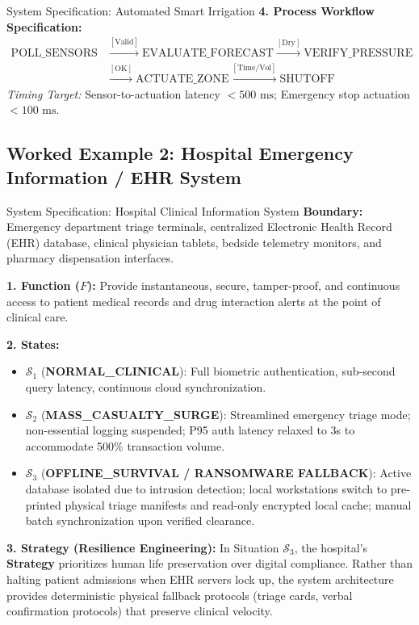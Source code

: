 \begin{examplebox}{System Specification: Automated Smart Irrigation}
\textbf{4. Process Workflow Specification:}
\begin{equation}
\begin{aligned}
    \text{POLL\_SENSORS} &\xrightarrow{[\text{Valid}]} \text{EVALUATE\_FORECAST} \xrightarrow{[\text{Dry}]} \text{VERIFY\_PRESSURE} \\
    &\xrightarrow{[\text{OK}]} \text{ACTUATE\_ZONE} \xrightarrow{[\text{Time/Vol}]} \text{SHUTOFF}
\end{aligned}
\end{equation}
\textit{Timing Target:} Sensor-to-actuation latency $< 500\text{ ms}$; Emergency stop actuation $< 100\text{ ms}$.
\end{examplebox}

\subsection{Worked Example 2: Hospital Emergency Information / EHR System}
\begin{examplebox}{System Specification: Hospital Clinical Information System}
\textbf{Boundary:} Emergency department triage terminals, centralized Electronic Health Record (EHR) database, clinical physician tablets, bedside telemetry monitors, and pharmacy dispensation interfaces.

\textbf{1. Function ($F$):} Provide instantaneous, secure, tamper-proof, and continuous access to patient medical records and drug interaction alerts at the point of clinical care.

\textbf{2. States:}
\begin{itemize}[leftmargin=1.5em]
    \item $\mathcal{S}_1$ (\textbf{NORMAL\_CLINICAL}): Full biometric authentication, sub-second query latency, continuous cloud synchronization.
    \item $\mathcal{S}_2$ (\textbf{MASS\_CASUALTY\_SURGE}): Streamlined emergency triage mode; non-essential logging suspended; P95 auth latency relaxed to 3s to accommodate 500\% transaction volume.
    \item $\mathcal{S}_3$ (\textbf{OFFLINE\_SURVIVAL / RANSOMWARE FALLBACK}): Active database isolated due to intrusion detection; local workstations switch to pre-printed physical triage manifests and read-only encrypted local cache; manual batch synchronization upon verified clearance.
\end{itemize}

\textbf{3. Strategy (Resilience Engineering):}
In Situation $\mathcal{S}_3$, the hospital's \textbf{Strategy} prioritizes human life preservation over digital compliance. Rather than halting patient admissions when EHR servers lock up, the system architecture provides deterministic physical fallback protocols (triage cards, verbal confirmation protocols) that preserve clinical velocity.
\end{examplebox}


